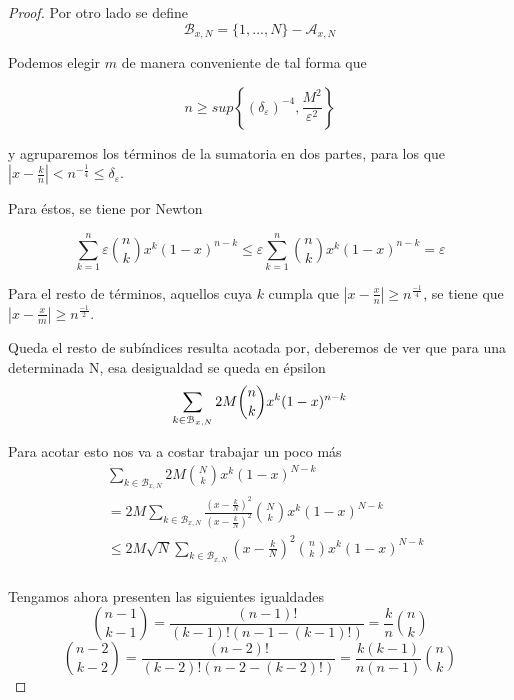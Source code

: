 \begin{proof}
    Por otro lado se define
    $$\mathcal{B}_{x,N} = \{1, ..., N\} - \mathcal{A}_{x,N}$$


    Podemos elegir $m$ de manera conveniente de tal forma que 

    $$ n \geq sup \left\{ (\delta_\varepsilon) ^{-4}, \frac{M^2}{\varepsilon^2}\right\}$$


    y agruparemos los términos de la sumatoria en dos partes, para los que 
    $|x - \frac{k}{n}| < n^{ -\frac{1}{4}} \leq \delta_\varepsilon$. 

    Para éstos,  se tiene por Newton  

    \begin{equation*}
        \sum_{k=1}^n   \varepsilon \binom{n}{k} x^k (1-x)^{n-k} \leq \varepsilon \sum_{k=1}^n \binom{n}{k} x^k (1-x)^{n-k} =  \varepsilon
    \end{equation*}

    Para el resto de términos, aquellos cuya $k$ cumpla que $|x - \frac{x}{n}| \geq n ^\frac{-1}{4}$, se tiene que 
    $|x - \frac{x}{m}| \geq n ^\frac{-1}{2}$. 

    Queda el resto de subíndices resulta acotada por, deberemos de ver que para una determinada N, 
    esa desigualdad se queda en épsilon
    \begin{equation*}
        \sum_{k \in \mathcal{B}_{x,N}} 2M \binom{n}{k} x^k (1-x) ^{n-k} \\
    \end{equation*}

    Para acotar esto nos va a costar trabajar un poco más 
    \begin{equation*} 
        \begin{split}
        \label{eq:Bernstein_caso_a_acotar}
        & \sum_{k \in \mathcal{B}_{x,N}} 2M \binom{N}{k} x^k (1-x) ^{N-k} \\
        & = 2M  \sum_{k \in \mathcal{B}_{x,N}}  \frac{(x- \frac{k}{N})^2}{(x- \frac{k}{N})^2} \binom{N}{k} x^k (1-x) ^{N-k} \\
        & \leq 2M \sqrt{N} \sum_{k \in \mathcal{B}_{x,N}}  (x- \frac{k}{N})^2 \binom{n}{k} x^k (1-x) ^{N-k} \\
    \end{split}
    \end{equation*}


    Tengamos ahora presenten las siguientes igualdades 
    \begin{equation} \label{eq:binomio_menos_uno}
        \binom{n-1}{k-1} = \frac{(n-1)!}{(k-1)! (n-1-(k-1)!)} = \frac{k}{n} \binom{n}{k}
    \end{equation}
    \begin{equation} \label{eq:binomio_menos_dos}
        \binom{n-2}{k-2} = \frac{(n-2)!}{(k-2)! (n-2-(k-2)!)} = \frac{k(k-1)}{n(n-1)} \binom{n}{k}
    \end{equation}


\end{proof}
